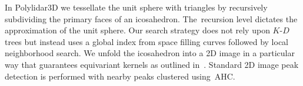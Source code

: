 In Polylidar3D we tessellate the unit sphere with triangles by recursively subdividing the primary faces of an icosahedron. The~recursion level dictates the approximation of the unit sphere. Our search strategy does not rely upon $K$-$D$ trees but instead uses a global index from space filling curves followed by local neighborhood search. We unfold the icosahedron into a 2D image in a particular way that guarantees equivariant kernels as outlined in~\cite{cohen_gauge_2019}. Standard 2D image peak detection is performed with nearby peaks clustered using~AHC.













